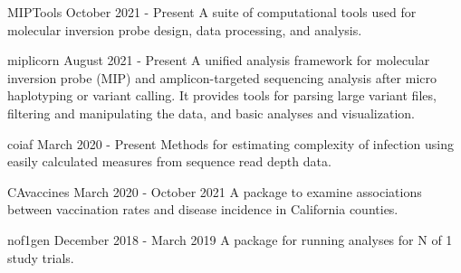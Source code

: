 
\begin{cvprojects}

  \cvproject
    {MIPTools} %
    {October 2021 - Present} %
    {A suite of computational tools used for molecular inversion probe design,
    data processing, and analysis.} %

  \cvproject
    {miplicorn} %
    {August 2021 - Present} %
    {A unified analysis framework for molecular inversion probe (MIP) and
    amplicon-targeted sequencing analysis after micro haplotyping or variant
    calling. It provides tools for parsing large variant files, filtering and
    manipulating the data, and basic analyses and visualization.} %

  \cvproject
    {coiaf} %
    {March 2020 - Present} %
    {Methods for estimating complexity of infection using easily calculated
    measures from sequence read depth data.} %

  \cvproject
    {CAvaccines}
    {March 2020 - October 2021}
    {A package to examine associations between vaccination rates and disease
    incidence in California counties.}

  \cvproject
    {nof1gen}
    {December 2018 - March 2019}
    {A package for running analyses for N of 1 study trials.}

\end{cvprojects}
